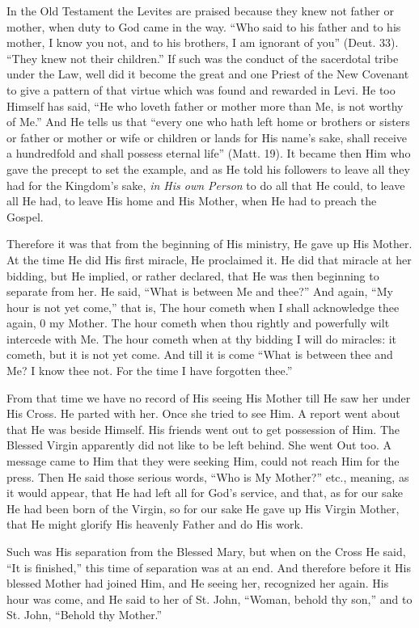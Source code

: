 In the Old Testament the Levites are praised
because they knew not father or mother, when duty to God came in the
way. ``Who said to his father and to his mother, I know you not,
and to his brothers, I am ignorant of you'' (Deut. 33). ``They knew not
their children.'' If such was the conduct of the sacerdotal tribe under
the Law, well did it become the great and one Priest of the New
Covenant to give a pattern of that virtue which was found and rewarded
in Levi. He too Himself has said, ``He who loveth father or mother more
than Me, is not worthy of Me.'' And He tells us that ``every one who
hath left home or brothers or sisters or father or mother or wife or
children or lands for His name's sake, shall receive a hundredfold and
shall possess eternal life'' (Matt. 19). It became then Him who gave
the precept to set the example, and as He told his followers to leave
all they had for the Kingdom's sake, \emph{in His own Person} to do
all that He could, to leave all He had, to leave His home and His
Mother, when He had to preach the Gospel.

Therefore it was that from the beginning of His
ministry, He gave up His Mother. At the time He did His first
miracle, He proclaimed it. He did that miracle at her bidding, but He
implied, or rather declared, that He was then beginning to separate
from her. He said, ``What is between Me and thee?'' And again, ``My hour
is not yet come,'' that is, The hour cometh when I shall acknowledge
thee again, 0 my Mother. The hour cometh when thou rightly and
powerfully wilt intercede with Me. The hour cometh when at thy bidding
I will do miracles: it cometh, but it is not yet come. And till it is
come ``What is between thee and Me? I know thee not. For the time I
have forgotten thee.''

From that time we have no record of His seeing
His Mother till He saw her under His Cross. He parted with her. Once
she tried to see Him. A report went about that He was beside Himself.
His friends went out to get possession of Him. The Blessed Virgin
apparently did not like to be left behind. She went Out too. A message
came to Him that they were seeking Him, could not reach Him for the
press. Then He said those serious words, ``Who is My Mother?'' etc.,
meaning, as it would appear, that He had left all for God's service,
and that, as for our sake He had been born of the Virgin, so for our
sake He gave up His Virgin Mother, that He might glorify His heavenly
Father and do His work.

Such was His separation from the Blessed Mary,
but when on the Cross He said, ``It is finished,'' this time of separation was at an end. And therefore before it His blessed Mother
had joined Him, and He seeing her, recognized her again. His hour was
come, and He said to her of St. John, ``Woman, behold thy son,'' and to
St. John, ``Behold thy Mother.''

